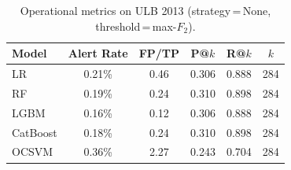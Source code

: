 \begin{table}[ht]
\centering
\caption{Operational metrics on ULB 2013 (strategy\,=\,None, threshold\,=\,max-$F_2$).}
\label{tab:ops_ulb}
\begin{tabular}{l c c c c c}
\toprule
Model & Alert Rate & FP/TP & P@$k$ & R@$k$ & $k$ \\
\midrule
LR         & 0.21\% & 0.46 & 0.306 & 0.888 & 284 \\
RF         & 0.19\% & 0.24 & 0.310 & 0.898 & 284 \\
LGBM       & 0.16\% & 0.12 & 0.306 & 0.888 & 284 \\
CatBoost   & 0.18\% & 0.24 & 0.310 & 0.898 & 284 \\
OCSVM      & 0.36\% & 2.27 & 0.243 & 0.704 & 284 \\
\bottomrule
\end{tabular}
\end{table}